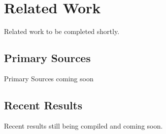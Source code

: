 %
%
\chapter{Related Work}\label{ch:relatedwork}

Related work to be completed shortly.

\section{Primary Sources}
Primary Sources coming soon


\section{Recent Results}
Recent results still being compiled and coming soon.